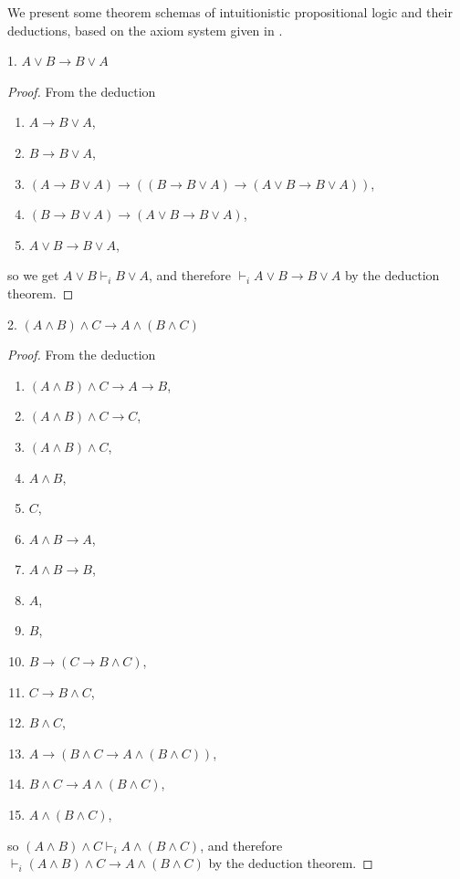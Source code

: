 \documentclass[12pt]{article}
\begin{document}
We present some theorem schemas of intuitionistic propositional logic and their deductions, based on the axiom system given in .

1. $A\lor B\to B\lor A$
\begin{proof} From the deduction
\begin{enumerate}
\item $A \to B\lor A$, 
\item $B \to B\lor A$,
\item $(A\to B\lor A)\to ((B\to B\lor A)\to (A\lor B\to B\lor A))$,
\item $(B\to B\lor A)\to (A\lor B\to B\lor A)$,
\item $A\lor B\to B\lor A$,
\end{enumerate}
so we get $A \lor B \vdash_i B\lor A$, and therefore $\vdash_i A\lor B\to B\lor A$ by the deduction theorem.
\end{proof}

2. $(A\land B)\land C \to A \land (B\land C)$
\begin{proof} From the deduction
\begin{multicols}{2}
\begin{enumerate}
\item $(A\land B)\land C \to A\to B$, 
\item $(A\land B)\land C \to C$, 
\item $(A\land B)\land C$, 
\item $A\land B$, 
\item $C$, 
\item $A\land B \to A$,
\item $A\land B \to B$,
\item $A$,
\item $B$,
\item $B\to (C\to B\land C)$,
\item $C\to B\land C$,
\item $B\land C$,
\item $A\to (B\land C \to A\land (B\land C))$,
\item $B\land C\to A\land (B\land C)$,
\item $A\land (B\land C)$,
\end{enumerate}
\end{multicols}
so $(A \land B)\land C \vdash_i A \land (B\land C)$, and therefore $\vdash_i (A\land B)\land C \to A \land (B\land C)$ by the deduction theorem.
\end{proof}
\end{document}
